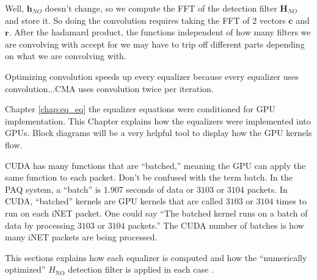 Well, $\mathbf{h}_{NO}$ doesn't change, so we compute the FFT of the detection filter $\mathbf{H}_{NO}$ and store it.
So doing the convolution requires taking the FFT of 2 vectors $\mathbf{c}$ and $\mathbf{r}$.
After the hadamard product, the functions independent of how many filters we are convolving with accept for we may have to trip off different parts depending on what we are convolving with.

Optimizing convolution speeds up every equalizer because every equalizer uses convolution...CMA uses convolution twice per iteration. 

Chapter \ref{chap:eq_eq} the equalizer equations were conditioned for GPU implementation.
This Chapter explains how the equalizers were implemented into GPUs.
Block diagrams will be a very helpful tool to display how the GPU kernels flow.

CUDA has many functions that are ``batched,'' meaning the GPU can apply the same function to each packet.
Don't be confused with the term batch. 
In the PAQ system, a ``batch'' is 1.907 seconds of data or $3103$ or $3104$ packets.
In CUDA, ``batched'' kernels are GPU kernels that are called $3103$ or $3104$ times to run on each iNET packet.
One could say ``The batched kernel runs on a batch of data by processing $3103$ or $3104$ packets.'' 
The CUDA number of batches is how many iNET packets are being processed.

This sections explains how each equalizer is computed and how the ``numerically optimized'' $H_\text{NO}$ detection filter is applied in each case \cite[Fig. 3]{perrins:2013}.

